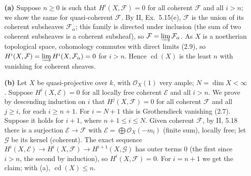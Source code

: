 \documentclass[11pt]{article}
\begin{document}
\pf
\textbf{(a)} Suppose $n\ge0$ is such that $H^i(X,\mathcal F)=0$ for all coherent $\mathcal F$ and all $i>n$; we show the same for quasi-coherent $\mathcal F$. By II, Ex.~5.15(e), $\mathcal F$ is the union of its coherent subsheaves $\mathcal F_\alpha$; this family is directed under inclusion (the sum of two coherent subsheaves is a coherent subsheaf), so $\mathcal F=\varinjlim\mathcal F_\alpha$. As $X$ is a noetherian topological space, cohomology commutes with direct limits (2.9), so $H^i(X,\mathcal F)=\varinjlim H^i(X,\mathcal F_\alpha)=0$ for $i>n$. Hence $\operatorname{cd}(X)$ is the least $n$ with vanishing for coherent sheaves.

\textbf{(b)} Let $X$ be quasi-projective over $k$, with $\mathcal O_X(1)$ very ample; $N=\dim X<\infty$. Suppose $H^i(X,\mathcal E)=0$ for all locally free coherent $\mathcal E$ and all $i>n$. We prove by descending induction on $i$ that $H^j(X,\mathcal F)=0$ for all coherent $\mathcal F$ and all $j\ge i$, for each $i\ge n+1$. For $i=N+1$ this is Grothendieck vanishing (2.7). Suppose it holds for $i+1$, where $n+1\le i\le N$. Given coherent $\mathcal F$, by II, 5.18 there is a surjection $\mathcal E\to\mathcal F$ with $\mathcal E=\bigoplus\mathcal O_X(-m_l)$ (finite sum), locally free; let $\mathcal G$ be its kernel (coherent). The exact sequence $H^i(X,\mathcal E)\to H^i(X,\mathcal F)\to H^{i+1}(X,\mathcal G)$ has outer terms $0$ (the first since $i>n$, the second by induction), so $H^i(X,\mathcal F)=0$. For $i=n+1$ we get the claim; with (a), $\operatorname{cd}(X)\le n$.
\end{document}
